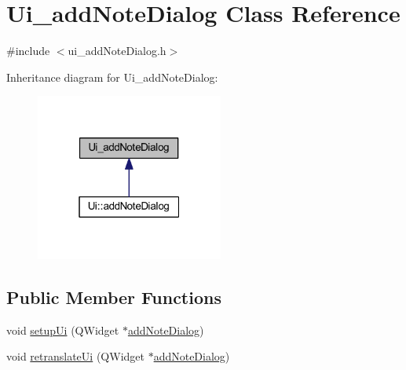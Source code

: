 \hypertarget{classUi__addNoteDialog}{}\section{Ui\+\_\+add\+Note\+Dialog Class Reference}
\label{classUi__addNoteDialog}


{\ttfamily \#include $<$ui\+\_\+add\+Note\+Dialog.\+h$>$}



Inheritance diagram for Ui\+\_\+add\+Note\+Dialog\+:
\nopagebreak
\begin{figure}[H]
\begin{center}
\leavevmode
\includegraphics[width=175pt]{classUi__addNoteDialog__inherit__graph}
\end{center}
\end{figure}
\subsection*{Public Member Functions}
\begin{DoxyCompactItemize}
\item 
void \hyperlink{classUi__addNoteDialog_a2487f1cd1542da959f06b7412e80ef0b}{setup\+Ui} (Q\+Widget $\ast$\hyperlink{classaddNoteDialog}{add\+Note\+Dialog})
\item 
void \hyperlink{classUi__addNoteDialog_aab12c63dbd7ceae65cefd5be2a09c2ab}{retranslate\+Ui} (Q\+Widget $\ast$\hyperlink{classaddNoteDialog}{add\+Note\+Dialog})
\end{DoxyCompactItemize}
